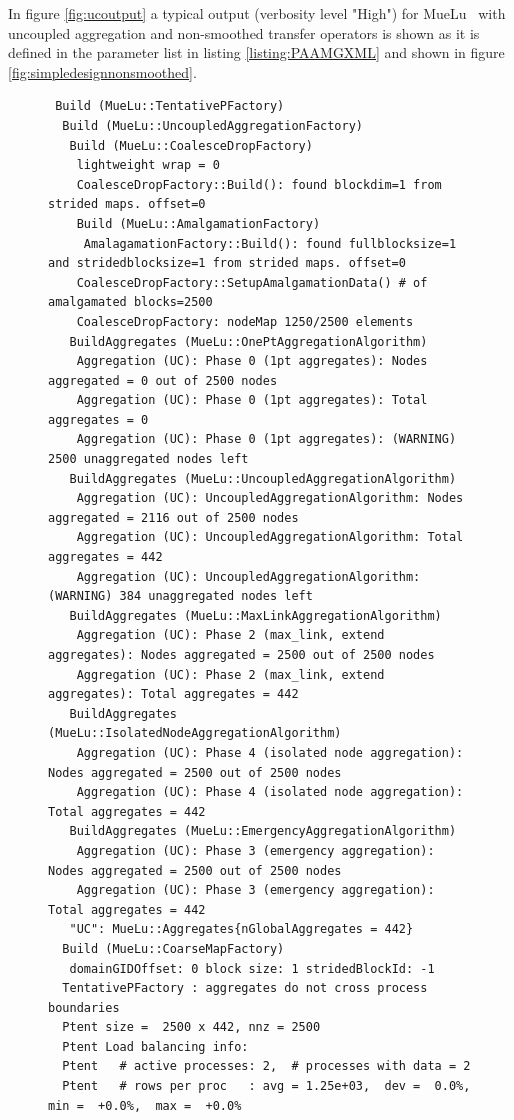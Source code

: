 \documentclass[12pt,a4paper]{article}
\newcommand{\MueLu}{MueLu}
\begin{document}
In figure \ref{fig:ucoutput} a typical output (verbosity level "High") for \MueLu~ with uncoupled aggregation and non-smoothed transfer operators is shown as it is defined in the parameter list in listing \ref{listing:PAAMGXML} and shown in figure \ref{fig:simpledesignnonsmoothed}.
\begin{figure}
\tiny
\begin{verbatim}
 Build (MueLu::TentativePFactory)
  Build (MueLu::UncoupledAggregationFactory)
   Build (MueLu::CoalesceDropFactory)
    lightweight wrap = 0
    CoalesceDropFactory::Build(): found blockdim=1 from strided maps. offset=0
    Build (MueLu::AmalgamationFactory)
     AmalagamationFactory::Build(): found fullblocksize=1 and stridedblocksize=1 from strided maps. offset=0
    CoalesceDropFactory::SetupAmalgamationData() # of amalgamated blocks=2500
    CoalesceDropFactory: nodeMap 1250/2500 elements
   BuildAggregates (MueLu::OnePtAggregationAlgorithm)
    Aggregation (UC): Phase 0 (1pt aggregates): Nodes aggregated = 0 out of 2500 nodes
    Aggregation (UC): Phase 0 (1pt aggregates): Total aggregates = 0
    Aggregation (UC): Phase 0 (1pt aggregates): (WARNING) 2500 unaggregated nodes left
   BuildAggregates (MueLu::UncoupledAggregationAlgorithm)
    Aggregation (UC): UncoupledAggregationAlgorithm: Nodes aggregated = 2116 out of 2500 nodes
    Aggregation (UC): UncoupledAggregationAlgorithm: Total aggregates = 442
    Aggregation (UC): UncoupledAggregationAlgorithm: (WARNING) 384 unaggregated nodes left
   BuildAggregates (MueLu::MaxLinkAggregationAlgorithm)
    Aggregation (UC): Phase 2 (max_link, extend aggregates): Nodes aggregated = 2500 out of 2500 nodes
    Aggregation (UC): Phase 2 (max_link, extend aggregates): Total aggregates = 442
   BuildAggregates (MueLu::IsolatedNodeAggregationAlgorithm)
    Aggregation (UC): Phase 4 (isolated node aggregation): Nodes aggregated = 2500 out of 2500 nodes
    Aggregation (UC): Phase 4 (isolated node aggregation): Total aggregates = 442
   BuildAggregates (MueLu::EmergencyAggregationAlgorithm)
    Aggregation (UC): Phase 3 (emergency aggregation): Nodes aggregated = 2500 out of 2500 nodes
    Aggregation (UC): Phase 3 (emergency aggregation): Total aggregates = 442
   "UC": MueLu::Aggregates{nGlobalAggregates = 442}
  Build (MueLu::CoarseMapFactory)
   domainGIDOffset: 0 block size: 1 stridedBlockId: -1
  TentativePFactory : aggregates do not cross process boundaries
  Ptent size =  2500 x 442, nnz = 2500
  Ptent Load balancing info:
  Ptent   # active processes: 2,  # processes with data = 2
  Ptent   # rows per proc   : avg = 1.25e+03,  dev =  0.0%,  min =  +0.0%,  max =  +0.0%

\end{verbatim}
\end{figure}
\end{document}

